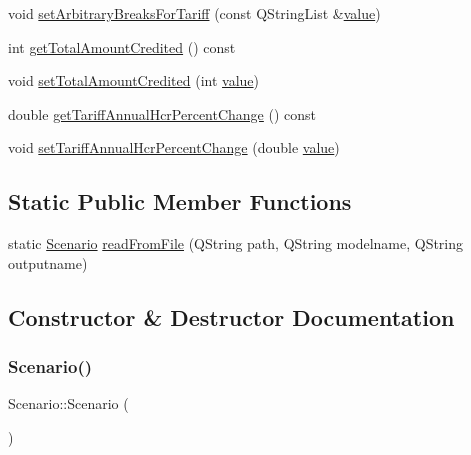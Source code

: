 \begin{DoxyCompactItemize}
\item 
void \mbox{\hyperlink{class_scenario_aa1da7e8240a6826c070307974f821dd3}{set\+Arbitrary\+Breaks\+For\+Tariff}} (const Q\+String\+List \&\mbox{\hyperlink{diffusion_8cpp_a4b41795815d9f3d03abfc739e666d5da}{value}})
\item 
int \mbox{\hyperlink{class_scenario_aed6ea5809c37db24d8d244f8bc5e569f}{get\+Total\+Amount\+Credited}} () const
\item 
void \mbox{\hyperlink{class_scenario_aa4a29bec8fc7503ede9db6b528ab5824}{set\+Total\+Amount\+Credited}} (int \mbox{\hyperlink{diffusion_8cpp_a4b41795815d9f3d03abfc739e666d5da}{value}})
\item 
double \mbox{\hyperlink{class_scenario_a579b7999efc4bd86fdc727ac554d960b}{get\+Tariff\+Annual\+Hcr\+Percent\+Change}} () const
\item 
void \mbox{\hyperlink{class_scenario_a035a0625364722ca0e0b4d4c0cdb818b}{set\+Tariff\+Annual\+Hcr\+Percent\+Change}} (double \mbox{\hyperlink{diffusion_8cpp_a4b41795815d9f3d03abfc739e666d5da}{value}})
\end{DoxyCompactItemize}
\subsection*{Static Public Member Functions}
\begin{DoxyCompactItemize}
\item 
static \mbox{\hyperlink{class_scenario}{Scenario}} \mbox{\hyperlink{class_scenario_a90a507a75389bc2b5955ee16ad95fda3}{read\+From\+File}} (Q\+String path, Q\+String modelname, Q\+String outputname)
\end{DoxyCompactItemize}


\subsection{Constructor \& Destructor Documentation}
\mbox{\label{class_scenario_ac81a05dad61b30116332ea971359a41e}} 
\subsubsection{\texorpdfstring{Scenario()}{Scenario()}}
{\footnotesize\ttfamily Scenario\+::\+Scenario (\begin{DoxyParamCaption}{ }\end{DoxyParamCaption})}




